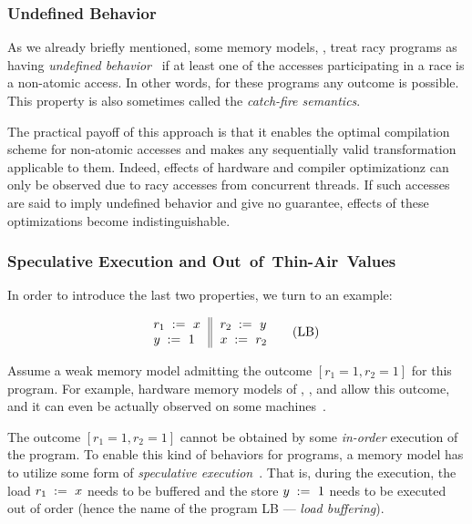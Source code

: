\subsubsection{Undefined Behavior}
\label{sec:background:ub}

As we already briefly mentioned, some memory models, 
\eg \CPP, treat racy programs as having 
\emph{undefined behavior}~\cite{Boehm-Adve:PLDI08}
if at least one of the accesses participating 
in a race is a non-atomic access. 
In other words, for these programs any outcome is possible. 
This property is also sometimes called the \emph{catch-fire semantics}.
  
The practical payoff of this approach  
is that it enables the optimal compilation scheme 
for non-atomic accesses and makes any sequentially valid 
transformation applicable to them.  
Indeed, effects of hardware and compiler 
optimizationz can only be observed due to racy accesses
from concurrent threads. If such accesses are said 
to imply undefined behavior and give no guarantee, 
effects of these optimizations become indistinguishable.

\subsubsection{Speculative Execution and Out~of~Thin-Air~Values}
\label{sec:background:oota}

In order to introduce the last two properties, we turn to an example: 

\begin{equation*}
\inarrII{
  \readInst{}{r_1}{x}     \\
  \writeInst{}{y}{1}      \\
}{
  \readInst{}{r_2}{y}     \\
  \writeInst{}{x}{r_2}    \\
}
\tag{LB}\label{ex:lb}
\end{equation*}

Assume a weak memory model admitting 
the outcome ${[r_1=1, r_2=1]}$ for this program.
For example, hardware memory models of 
, , and \POWER
allow this outcome, and it can even be 
actually observed on some  
machines~\cite{Maranget-al:Tutorial2012}.

The outcome ${[r_1=1, r_2=1]}$ cannot be obtained by some 
\emph{in-order} execution of the program. 
To enable this kind of behaviors for programs, 
a memory model has to utilize some form of 
\emph{speculative execution}~\cite{Boudol-Petri:ESOP10, Boehm-Demsky:MSPC14}.
That is, during the execution, the load $r_1\;:=_{}\;x$
needs to be buffered and the store $y\;:=_{}\;1$ 
needs to be executed out of order
(hence the name of the program LB --- \emph{load buffering}).

